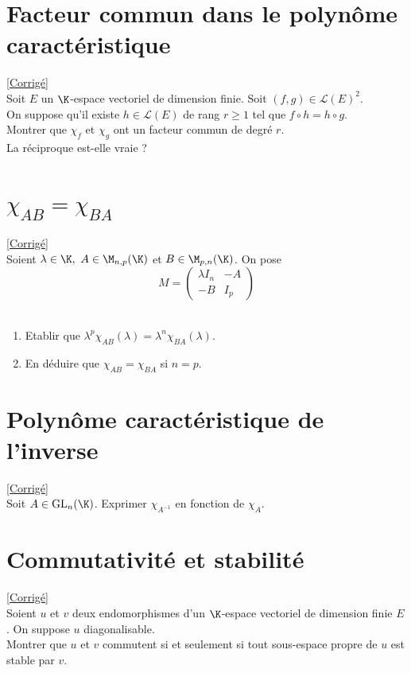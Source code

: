 \documentclass[8pt]{book}
\begin{document}
	\section{Facteur commun dans le polynôme caractéristique }
	\label{Facteur commun dans le polynôme caractéristique}
	\textcolor{blue}{\hyperref[Facteur commun dans le polynôme caractéristique corrigé]{[Corrigé]}}\\
	Soit $E$ un $\K$-espace vectoriel de dimension finie. Soit $(f,g)\in \mathcal{L}(E)^2$.\\ On suppose qu'il existe $h\in \mathcal{L}(E)$ de rang $r\geq 1$ tel que $f\circ h=h\circ g$.\\ Montrer que $\chi_f$ et $\chi_g$ ont un facteur commun de degré $r$.\\
	La réciproque est-elle vraie ?
	
	\section{$\chi_{AB}=\chi_{BA}$ }
	\label{chiAB=chiBA}
	\textcolor{blue}{\hyperref[chiAB=chiBA corrigé]{[Corrigé]}}\\
	Soient $\lambda\in \K,\ A\in \M_{n,p}(\K)$ et $B\in \M_{p,n}(\K)$. On pose $$M=\left( \begin{array}{c|c}
		\lambda I_n&-A\\
		\hline
		-B&I_p
	\end{array}\right)$$\\
	\begin{enumerate}
		\item Etablir que $\lambda^p\chi_{AB}(\lambda)=\lambda^n\chi_{BA}(\lambda)$.\\
		\item En déduire que $\chi_{AB}=\chi_{BA}$ si $n=p$.
	\end{enumerate}

	\section{Polynôme caractéristique de l'inverse }
	\label{Polynôme caractérisque de l'inverse}
	\textcolor{blue}{\hyperref[Polynôme caractéristique de l'inverse corrigé]{[Corrigé]}}\\
	Soit $A\in \text{GL}_n(\K)$. Exprimer $\chi_{A^{-1}}$ en fonction de $\chi_A$.
	
	\section{Commutativité et stabilité }
	\label{Commutativité et stabilité}
	\textcolor{blue}{\hyperref[Communtativité et stabilité corrigé]{[Corrigé]}}\\
	Soient $u$ et $v$ deux endomorphismes d'un $\K$-espace vectoriel de dimension finie $E$. On suppose $u$ diagonalisable.\\
	Montrer que $u$ et $v$ commutent si et seulement si tout sous-espace propre de $u$ est stable par $v$.
	
\end{document}
